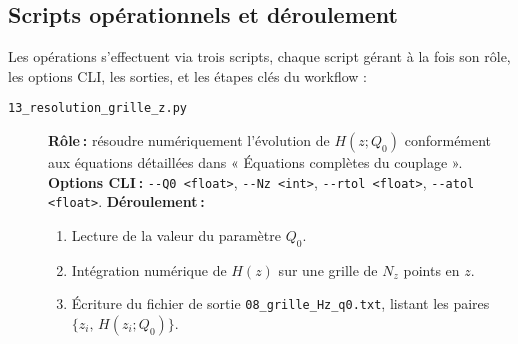 \subsection{Scripts opérationnels et déroulement}

Les opérations s’effectuent via trois scripts, chaque script gérant à la fois son rôle, les options CLI, les sorties, et les étapes clés du workflow :

\begin{description}
  \item[\texttt{13\_resolution\_grille\_z.py}]
    \textbf{Rôle :} résoudre numériquement l’évolution de \(H(z;Q_{0})\) conformément aux équations détaillées dans « Équations complètes du couplage ».
    \textbf{Options CLI :}
      \verb|--Q0 <float>|, \verb|--Nz <int>|, \verb|--rtol <float>|, \verb|--atol <float>|.
    \textbf{Déroulement :}
    \begin{enumerate}
      \item Lecture de la valeur du paramètre \(Q_{0}\).
      \item Intégration numérique de \(H(z)\) sur une grille de \(N_z\) points en \(z\).
      \item Écriture du fichier de sortie \texttt{08\_grille\_Hz\_q0.txt}, listant les paires \(\{z_{i},\,H(z_{i};Q_{0})\}\).
    \end{enumerate}


\end{description}
